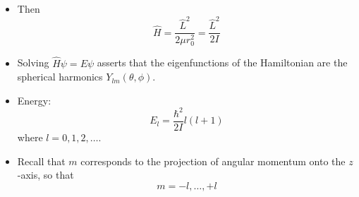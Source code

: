\documentclass[../notes.tex]{subfiles}
\begin{document}
\begin{itemize}
\begin{itemize}
        \item Then
        \begin{equation*}
            \hat{H} = \frac{\hat{L}^2}{2\mu r_0^2} = \frac{\hat{L}^2}{2I}
        \end{equation*}
        \item Solving $\hat{H}\psi=E\psi$ asserts that the eigenfunctions of the Hamiltonian are the spherical harmonics $Y_{l m}(\theta,\phi)$.
        \item Energy:
        \begin{equation*}
            E_l = \frac{\hbar^2}{2I}l(l+1)
        \end{equation*}
        where $l=0,1,2,\dots$.
        \item Recall that $m$ corresponds to the projection of angular momentum onto the $z$-axis, so that
        \begin{equation*}
            m = -l,\dots,+l
        \end{equation*}
    \end{itemize}
\end{itemize}
\end{document}
